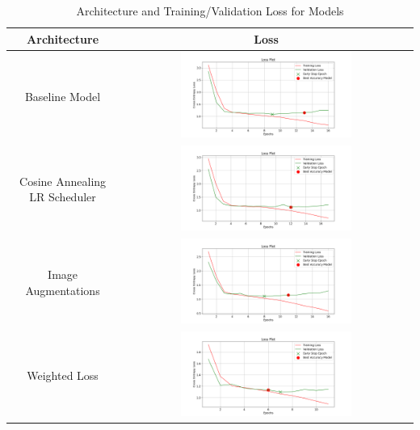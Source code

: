 \documentclass{article}
\begin{document}
\begin{table}[H]
\label{tab:results}
\centering
\begin{tabular}{|c|c|}
\hline
\textbf{Architecture} & \textbf{Loss} \\
\hline
Baseline Model & \includegraphics[width=0.6\textwidth]{loss_basic_fcn.png}\\
\hline
Cosine Annealing LR Scheduler & \includegraphics[width=0.6\textwidth]{cosine_plot.png} \\
\hline
Image Augmentations & \includegraphics[width=0.6\textwidth]{loss_augment.png} \\
\hline
Weighted Loss  & \includegraphics[width=0.6\textwidth]{class_loss.png} \\
\hline
\end{tabular}
\caption{Architecture and Training/Validation Loss for Models}
\label{tab:architecture_loss}
\end{table}
\end{document}
